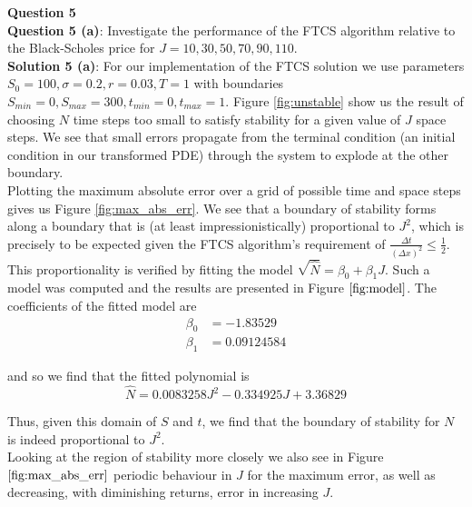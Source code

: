 \documentclass[12pt]{article}
\newlength\tindent
\renewcommand{\indent}{\hspace*{\tindent}}
\begin{document}

\newpage
{\bf\large Question 5} \\


{\bf Question 5 (a)}: Investigate the performance of the FTCS algorithm relative to the Black-Scholes price for $J = 10, 30, 50, 70, 90, 110$. \\

{\bf Solution 5 (a)}: For our implementation of the FTCS solution we use parameters $S_0 = 100, \sigma = 0.2, r = 0.03, T = 1$ with boundaries $S_{min} = 0, S_{max} = 300, t_{min} = 0, t_{max} = 1$. Figure \ref{fig:unstable} show us the result of choosing $N$ time steps too small to satisfy stability for a given value of $J$ space steps. We see that small errors propagate from the terminal condition (an initial condition in our transformed PDE) through the system to explode at the other boundary. \\

\indent Plotting the maximum absolute error over a grid of possible time and space steps gives us Figure \ref{fig:max_abs_err}. We see that a boundary of stability forms along a boundary that is (at least impressionistically) proportional to $J^2$, which is precisely to be expected given the FTCS algorithm's requirement of $\frac{ \Delta t }{ (\Delta x)^2 } \leq \frac{1}{2}$. This proportionality is verified by fitting the model $\sqrt{\hat{N}} = \beta_0 + \beta_1 J$. Such a model was computed and the results are presented in Figure $\ref{fig:model}$. The coefficients of the fitted model are
\begin{align*}
	\beta_0 &= -1.83529 \\
	\beta_1 &= 0.09124584
\end{align*}

and so we find that the fitted polynomial is 
\begin{equation*}
	\hat{N} = 0.0083258J^2 - 0.334925J + 3.36829
\end{equation*}

Thus, given this domain of $S$ and $t$, we find that the boundary of stability for $N$ is indeed proportional to $J^2$. \\

\indent Looking at the region of stability more closely we also see in Figure $\ref{fig:max_abs_err}$ periodic behaviour in $J$ for the maximum error, as well as decreasing, with diminishing returns, error in increasing $J$. \\
\end{document}
